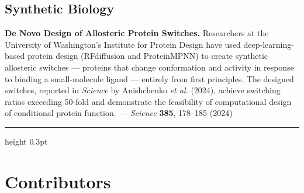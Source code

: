 \documentclass[a4paper,11pt]{article}
\begin{document}
\subsection*{Synthetic Biology}

{\sffamily\bfseries\color{accent}De Novo Design of Allosteric Protein Switches.}
Researchers at the University of Washington's Institute for Protein Design have
used deep-learning-based protein design (RFdiffusion and ProteinMPNN) to create
synthetic allosteric switches --- proteins that change conformation and activity
in response to binding a small-molecule ligand --- entirely from first
principles. The designed switches, reported in \textit{Science} by Anishchenko
\textit{et al.} (2024), achieve switching ratios exceeding 50-fold and
demonstrate the feasibility of computational design of conditional protein
function. \textit{--- Science} {\bf 385}, 178--185 (2024)

\vspace{10pt}
{\color{lightrule}\hrule height 0.3pt}

\vspace{14pt}
\section{Contributors}
\end{document}

